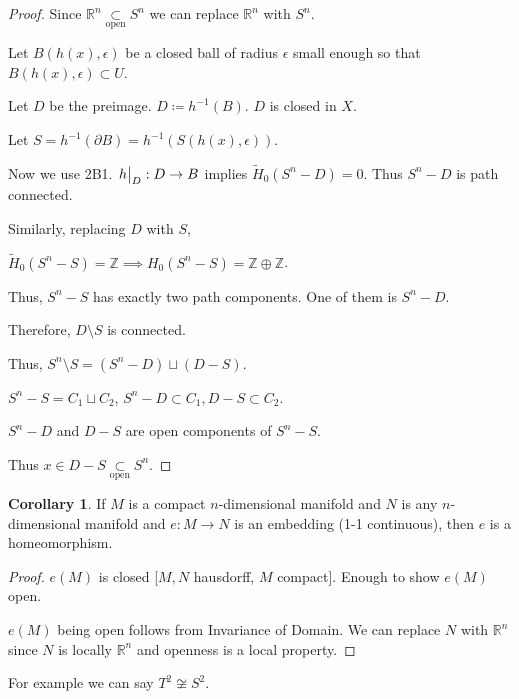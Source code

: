 \documentclass{article}
\theoremstyle{definition}
\newtheorem{corollary}[theorem]{Corollary}
\begin{document}
    \begin{proof}
        Since \(\mathbb{R}^n \underset{\text{open}}{\subset} S^n\) we can replace \(\mathbb{R}^n\) with \(S^n\).

        Let \(B(h(x), \epsilon)\) be a closed ball of radius \(\epsilon\) small enough so that \(B(h(x),\epsilon) \subset U\).

        Let \(D\) be the preimage. \(D\coloneqq h ^{-1} (B)\). \(D\) is closed in \(X\).

        Let \(S = h^{-1} (\partial B) = h^{-1} (S(h(x),\epsilon))\). 

        Now we use 2B1. \(\eval{h}_D : D \to B\) implies \(\widetilde{H}_0(S^n - D) = 0\). Thus \(S^n - D\) is path connected.

        Similarly, replacing \(D\) with \(S\),

        \(\widetilde{H}_0(S^n - S) = \mathbb{Z} \implies H_0(S^n - S) = \mathbb{Z} \oplus \mathbb{Z}\).

        Thus, \(S^n - S\) has exactly two path components. One of them is \(S^n - D\).

        Therefore, \(D \setminus S\) is connected.

        Thus, \(S^n \setminus S = (S^n - D) \sqcup (D - S)\).

        \(S^n - S = C_1 \sqcup C_2\), \(S^n - D \subset C_1, D - S \subset C_2\).

        \(S^n - D\) and \(D - S\) are open components of \(S^n - S\).

        Thus \(x\in D-S \underset{\text{open}}{\subset} S^n\).
    \end{proof}

    \begin{corollary}
        If \(M\) is a compact \(n\)-dimensional manifold and \(N\) is any \(n\)-dimensional manifold and \(e: M \to N\) is an embedding (1-1 continuous), then \(e\) is a homeomorphism.
    \end{corollary}

    \begin{proof}
        \(e(M)\) is closed [\(M,N\) hausdorff, \(M\) compact]. Enough to show \(e(M)\) open.

        \(e(M)\) being open follows from Invariance of Domain. We can replace \(N\) with \(\mathbb{R}^n\) since \(N\) is locally \(\mathbb{R}^n\) and openness is a local property.
    \end{proof}

    For example we can say \(T^2 \not\cong S^2\).
\end{document}
